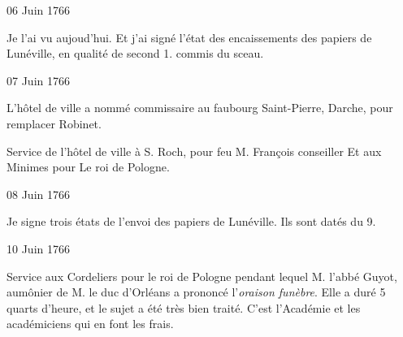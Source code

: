                      \begin{diary}{06 Juin 1766}{}
                        
                         Je l'ai vu aujoud'hui.
                           Et j'ai signé l'état des encaissements des
                           papiers de Lunéville, en
                           qualité de second 1.
                           commis du sceau. \bigskip
        
        
                     \end{diary}
                     
                     

                     \begin{diary}{07 Juin 1766}{}
                        
                        
                           L'hôtel de ville a nommé commissaire au
                           faubourg
                              Saint-Pierre, Darche, pour
                           remplacer
                           Robinet. \bigskip
        
        
                         Service de l'hôtel de ville à S. Roch, pour
                           feu M. François conseiller
                           Et aux Minimes pour Le roi de Pologne. \bigskip
        
        
                     \end{diary}

                     \begin{diary}{08 Juin 1766}{}
                        
                         Je signe trois états de l'envoi des papiers
                           de Lunéville. Ils sont datés du 9. \bigskip
        
        
                     \end{diary}

                     \begin{diary}{10 Juin 1766}{}
                        
                         Service aux Cordeliers pour le roi de Pologne
                           pendant
                           lequel M. l'abbé Guyot,
                           aumônier de M. le
                              duc d'Orléans a prononcé l'\emph{oraison funèbre}. Elle a
                           duré 5 quarts d'heure, et le sujet a été très
                           bien traité. C'est l'Académie
                           et les académiciens
                           qui en font les frais. \bigskip
        
        
                     \end{diary}


